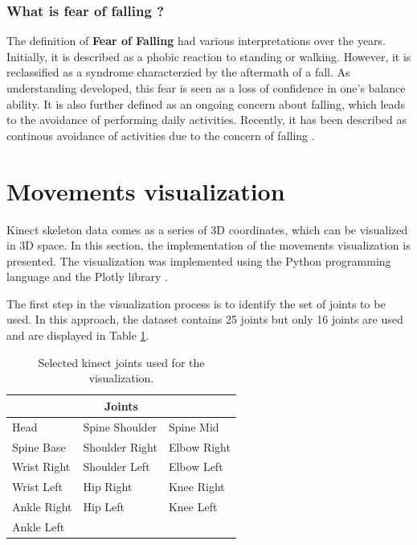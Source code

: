         \subsubsection{What is fear of falling ?}
        
            The definition of \textbf{Fear of Falling} had various interpretations over the years. Initially, it is described as a phobic reaction to standing or walking. However, it is reclassified as a syndrome characterzied by the aftermath of a fall. As understanding developed, this fear is seen as a loss of confidence in one's balance ability. It is also further defined as an ongoing concern about falling, which leads to the avoidance of performing daily activities. Recently, it has been described as continous avoidance of activities due to the concern of falling \cite{jung_fear_2008}.
    
    \section{Movements visualization} \label{sec:movements_visualization}
        
        Kinect skeleton data comes as a series of 3D coordinates, which can be visualized in 3D space. In this section, the implementation of the movements visualization is presented. The visualization was implemented using the Python programming language and the Plotly library \cite{plotly}.

        The first step in the visualization process is to identify the set of joints to be used. In this approach, the dataset contains 25 joints but only 16 joints are used and are displayed in Table \ref{tab:joints_select}. 

        \begin{table}[H]
            \centering
            \begin{tabularx}{1.0\textwidth}{XXX}
                \toprule
                \multicolumn{3}{c}{\textbf{Joints}} \\
                \midrule
                Head & Spine Shoulder & Spine Mid \\
                Spine Base & Shoulder Right & Elbow Right \\
                Wrist Right & Shoulder Left & Elbow Left \\
                Wrist Left & Hip Right & Knee Right \\
                Ankle Right & Hip Left & Knee Left \\
                Ankle Left & & \\
                \bottomrule
            \end{tabularx}
            \caption{Selected kinect joints used for the visualization.}
            \label{tab:joints_select}
        \end{table}
        
